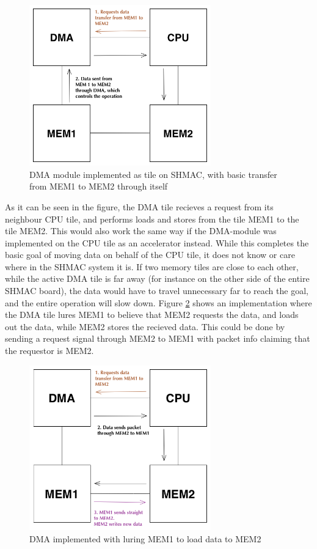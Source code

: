 \begin{figure}[h!]
    \centering
    \includegraphics[width=0.7\textwidth]{Figures/DMA/DMASHMAC1}
    \caption{DMA module implemented as tile on SHMAC, with basic transfer from MEM1 to MEM2 through itself}
    \label{fig:DMASHMAC1}
\end{figure}
 
As it can be seen in the figure, the DMA tile recieves a request from its neighbour CPU tile, and performs loads and stores from the tile MEM1 to the tile MEM2.
This would also work the same way if the DMA-module was implemented on the CPU tile as an accelerator instead.
While this completes the basic goal of moving data on behalf of the CPU tile, it does not know or care where in the SHMAC system it is.
If two memory tiles are close to each other, while the active DMA tile is far away (for instance on the other side of the entire SHMAC board), the data would have to travel unnecessary far to reach the goal, and the entire operation will slow down.
Figure \ref{fig:DMASHMAC2} shows an implementation where the DMA tile lures MEM1 to believe that MEM2 requests the data, and loads out the data, while MEM2 stores the recieved data.
This could be done by sending a request signal through MEM2 to MEM1 with packet info claiming that the requestor is MEM2. 

\begin{figure}[h!]
    \centering
    \includegraphics[width=0.7\textwidth]{Figures/DMA/DMASHMAC2}
    \caption{DMA implemented with luring MEM1 to load data to MEM2}
    \label{fig:DMASHMAC2}
\end{figure}
 
